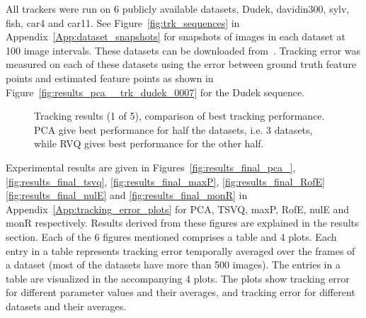 All trackers were run on 6 publicly available datasets, Dudek, davidin300, sylv, fish, car4 and car11.  See Figure~\ref{fig:trk_sequences} in Appendix~\ref{App:dataset_snapshots} for snapshots of images in each dataset at 100 image intervals.  These datasets can be downloaded from~\cite{2008_JNL_subspaceTRK_Ross}.  Tracking error was measured on each of these datasets using the error between ground truth feature points and estimated feature points as shown in Figure~\ref{fig:results_pca__trk_dudek_0007} for the Dudek sequence.

								\begin{figure}[t]
								\centering
								
								\caption{Tracking results (1 of 5), comparison of best tracking performance.  PCA give best performance for half the datasets, i.e. 3 datasets, while RVQ gives best performance for the other half.}
								\label{fig:results_final_1_best}
								\end{figure}

Experimental results are given in Figures~\ref{fig:results_final_pca_}, \ref{fig:results_final_tsvq}, \ref{fig:results_final_maxP}, \ref{fig:results_final_RofE} \ref{fig:results_final_nulE} and \ref{fig:results_final_monR} in Appendix~\ref{App:tracking_error_plots} for PCA, TSVQ, maxP, RofE, nulE and monR respectively.  Results derived from these figures are explained in the results section.  Each of the 6 figures mentioned comprises a table and 4 plots.  Each entry in a table represents tracking error temporally averaged over the frames of a dataset (most of the datasets have more than 500 images).  The entries in a table are visualized in the accompanying 4 plots.  The plots show tracking error for different parameter values and their averages, and tracking error for different datasets and their averages.  

